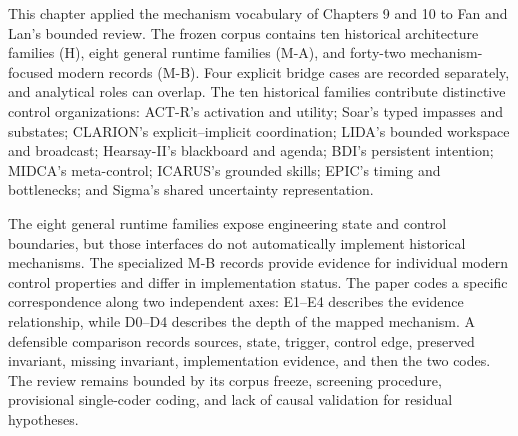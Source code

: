 \begin{chapterrecap}
This chapter applied the mechanism vocabulary of Chapters 9 and 10 to Fan and Lan's bounded review. The frozen corpus contains ten historical architecture families (H), eight general runtime families (M-A), and forty-two mechanism-focused modern records (M-B). Four explicit bridge cases are recorded separately, and analytical roles can overlap. The ten historical families contribute distinctive control organizations: ACT-R's activation and utility; Soar's typed impasses and substates; CLARION's explicit--implicit coordination; LIDA's bounded workspace and broadcast; Hearsay-II's blackboard and agenda; BDI's persistent intention; MIDCA's meta-control; ICARUS's grounded skills; EPIC's timing and bottlenecks; and Sigma's shared uncertainty representation.

The eight general runtime families expose engineering state and control boundaries, but those interfaces do not automatically implement historical mechanisms. The specialized M-B records provide evidence for individual modern control properties and differ in implementation status. The paper codes a specific correspondence along two independent axes: E1--E4 describes the evidence relationship, while D0--D4 describes the depth of the mapped mechanism. A defensible comparison records sources, state, trigger, control edge, preserved invariant, missing invariant, implementation evidence, and then the two codes. The review remains bounded by its corpus freeze, screening procedure, provisional single-coder coding, and lack of causal validation for residual hypotheses.
\end{chapterrecap}

